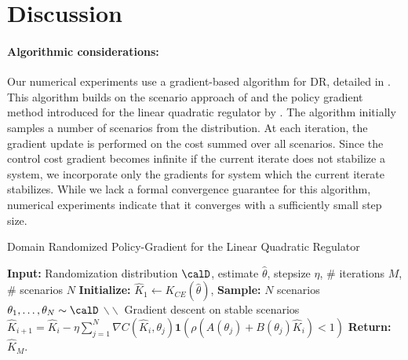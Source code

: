 \section{Discussion}

\paragraph{Algorithmic considerations:}
Our numerical experiments use a gradient-based algorithm for DR, detailed in . This algorithm builds on the scenario approach of \citet{vidyasagar2001randomized} and the policy gradient method introduced for the linear quadratic regulator by \citet{fazel2018global}. The algorithm initially samples a number of scenarios from the distribution. At each iteration, the gradient update is performed on the cost summed over all scenarios. Since the control cost gradient becomes infinite if the current iterate does not stabilize a system, we incorporate only the gradients for system which the current iterate stabilizes. While we lack a formal convergence guarantee for this algorithm, numerical experiments indicate that it converges with a sufficiently small step size.
\begin{algorithm}[t]
 \caption{Domain Randomized Policy-Gradient for the Linear Quadratic Regulator} 
 \label{alg: dr lqr}
\begin{algorithmic}[1]
\vspace{-2pt}
\State \textbf{Input: } Randomization distribution $\calD$, estimate $\hat \theta$, stepsize $\eta$, $\#$ iterations $M$, $\#$ scenarios $N$
\State \textbf{Initialize: } $\hat K_1 \gets K_{CE}(\hat \theta)$,
\State \textbf{Sample: }
 $N$ scenarios $\theta_1, \dots, \theta_N \sim \calD$%
      $\backslash\backslash$ Gradient descent on stable scenarios 
    \State $\hat K_{i+1} = \hat K_i - \eta \sum_{j=1}^N \nabla C(\hat K_i, \theta_{j}) \mathbf{1}(\rho(A(\theta_{j}) + B(\theta_{j}) \hat K_i) <1)$
    \EndFor
\State \textbf{Return: } $\hat K_{M}$. 
\end{algorithmic}
\vspace{-2pt}
\end{algorithm}

